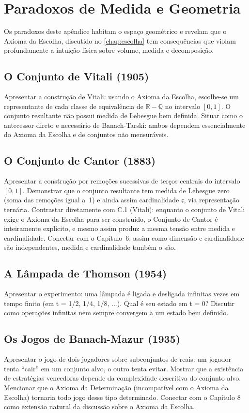 \chapter{Paradoxos de Medida e Geometria}
\label{chap:apendiceMedidaGeometria}

Os paradoxos deste apêndice habitam o espaço geométrico e revelam que o Axioma da Escolha, discutido no \autoref{chap:escolha} tem consequências que violam profundamente a intuição física sobre volume, medida e decomposição.

\section{O Conjunto de Vitali (1905)}

Apresentar a construção de Vitali: usando o Axioma da Escolha,
escolhe-se um representante de cada classe de equivalência de \(\mathbb{R}-\mathbb{Q}\)
no intervalo \([0,1]\). O conjunto resultante não possui medida de Lebesgue
bem definida.
Situar como o antecessor direto e necessário de Banach-Tarski:
ambos dependem essencialmente do Axioma da Escolha e de conjuntos
não mensuráveis.

\section{O Conjunto de Cantor (1883)}

Apresentar a construção por remoções sucessivas de terços centrais
do intervalo \([0,1]\). Demonstrar que o conjunto resultante tem
medida de Lebesgue zero (soma das remoções igual a~1) e ainda
assim cardinalidade \(\mathfrak{c}\), via representação ternária.
Contrastar diretamente com C.1 (Vitali): enquanto o conjunto de
Vitali exige o Axioma da Escolha para ser construído, o Conjunto
de Cantor é inteiramente explícito, e mesmo assim produz a mesma
tensão entre medida e cardinalidade. Conectar com o Capítulo~6:
assim como dimensão e cardinalidade são independentes, medida e
cardinalidade também o são.

\section{A Lâmpada de Thomson (1954)}

Apresentar o experimento: uma lâmpada é ligada e desligada infinitas
vezes em tempo finito (em t = 1/2, 1/4, 1/8, ...).
Qual é seu estado em t = 0?
Discutir como operações infinitas nem sempre convergem a um estado
bem definido.


\section{Os Jogos de Banach-Mazur (1935)}

Apresentar o jogo de dois jogadores sobre subconjuntos de reais:
um jogador tenta ``cair'' em um conjunto alvo, o outro tenta evitar.
Mostrar que a existência de estratégias vencedoras depende da
complexidade descritiva do conjunto alvo.
Mencionar que o Axioma da Determinação (incompatível com o Axioma
da Escolha) tornaria todo jogo desse tipo determinado.
Conectar com o Capítulo 8 como extensão natural da discussão sobre
o Axioma da Escolha.
